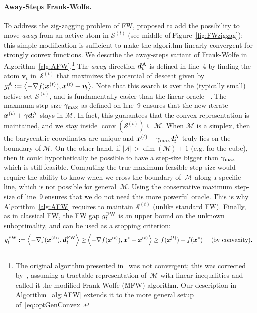 \documentclass{article} %
\newlength{\Sintextsep}
\DeclareMathOperator*{\conv}{conv}
\newcommand{\domain}{\mathcal{M}} %
\newcommand{\stepsize}{\gamma}
\newcommand{\stepmax}{\stepsize_{\textnormal{\scriptsize max}}} %
\newcommand{\FW}{{\hspace{0.05em}\textnormal{FW}}}
\newcommand{\away}{{\hspace{0.06em}\textnormal{\scriptsize A}}}
\newcommand{\x}{\bm{x}}
\newcommand{\dd}{\bm{d}}
\newcommand{\vv}{\bm{v}} %
\DeclareMathOperator*{\lmo}{LMO_{\!\Vertices}}
\newcommand{\Vertices}{\mathcal{A}} %
\newcommand{\Coreset}{\mathcal{S}}
\newcommand{\innerProd}[2]{\left\langle #1 , #2 \right\rangle}
\newcommand{\0}{\mathbf{0}} %
\begin{document}
\setlength{\intextsep}{\Sintextsep}

\vspace{-1.5mm}
\paragraph{Away-Steps Frank-Wolfe.}
To address the zig-zagging problem of FW, \citet{Wolfe:1970wy} proposed to
add the possibility to move \emph{away} from an active atom in
$\Coreset^{(t)}$ (see middle of Figure~\ref{fig:FWzigzag}); this simple
modification is sufficient to make the algorithm linearly convergent for
strongly convex functions. We describe the away-steps variant of Frank-Wolfe
in Algorithm~\ref{alg:AFW}.\footnote{%
The original algorithm presented in~\citep{Wolfe:1970wy} was not convergent;
this was corrected by~\citet{Guelat:1986fq}, %
assuming a tractable representation of~$\domain$ with linear inequalities and
called it the modified Frank-Wolfe (MFW) algorithm. Our description in
Algorithm~\ref{alg:AFW} extends it to the more general setup
of~\eqref{eq:optGenConvex}.
}
The \emph{away} direction $\dd_t^\away$ is defined in line~4 by finding the
atom $\vv_t$ in~$\Coreset^{(t)}$ that maximizes the potential of descent
given by $g_t^\away := \innerProd{-\nabla f(\x^{(t)})}{\x^{(t)} - \vv_t}$. 
Note that this search is over the (typically small) active set $\Coreset^{(t)}$, and is
fundamentally easier than the linear oracle $\lmo$. %
The maximum step-size $\stepmax$ as defined on line~9 ensures that the new
iterate $\x^{(t)} + \stepsize \dd_t^\away$ stays in $\domain$. %
In fact, this guarantees that the convex representation is maintained, and we 
stay inside $\conv(\Coreset^{(t)}) \subseteq \domain$.
%
When $\domain$ is a simplex, then the barycentric coordinates are unique and
$\x^{(t)} + \stepmax \dd_t^\away$ truly lies on the boundary of $\domain$. 
On the other hand, if $|\Vertices| > \dim(\domain)+1$ (e.g. for the cube), 
then it could hypothetically be possible to have a step-size bigger than $\stepmax$ which is still 
feasible. %
%
Computing the true
maximum feasible step-size would require the ability to know when we cross
the boundary of~$\domain$ along a specific line, which is not possible for
general~$\domain$. Using the conservative maximum step-size of line~9
ensures that we do not need this more powerful oracle. This is why
Algorithm~\ref{alg:AFW} requires to maintain $\Coreset^{(t)}$ (unlike
standard FW). %
%
Finally, as in classical FW, the FW gap $g_t^\FW$ is an upper bound on the unknown
suboptimality, and can be used as a stopping criterion: \vspace{-1mm}
\begin{equation*}
g_t^\FW := \innerProd{-\nabla f(\x^{(t)})}{\dd_t^\FW} \geq \innerProd{-\nabla
f(\x^{(t)})}{\x^* - \x^{(t)}} \geq f(\x^{(t)}) - f(\x^*) \quad \text{ (by
convexity)}.\vspace{-3mm}
\end{equation*}
\end{document}
